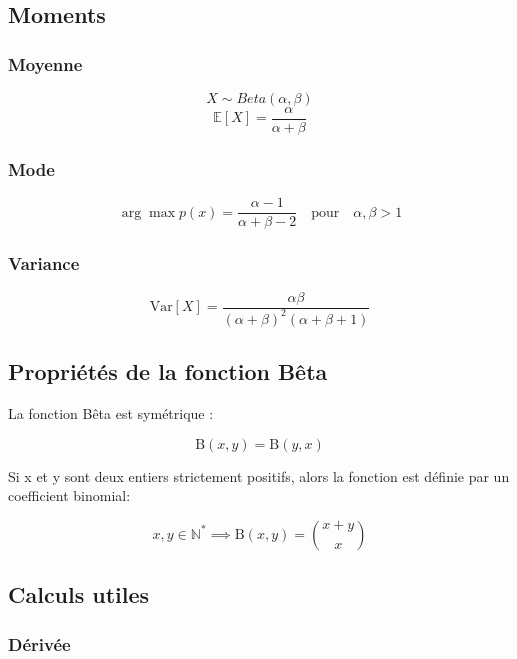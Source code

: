 \documentclass[french]{article}
\numberwithin{equation}{section}
\begin{document}
\subsection{Moments}

\subsubsection{Moyenne}

\[ X \sim Beta(\alpha, \beta) \]
\begin{equation}
\mathbb{E}[X] = \frac{\alpha}{\alpha + \beta}
\end{equation}

\subsubsection{Mode}

\begin{equation}
\arg\max p(x) = \frac{\alpha - 1}{\alpha + \beta - 2} \quad \text{pour} \quad \alpha, \beta > 1
\end{equation}

\subsubsection{Variance}

\begin{equation}
\text{Var}[X] = \frac{\alpha \beta}{(\alpha + \beta)^2(\alpha + \beta + 1)}
\end{equation}

\subsection{Propriétés de la fonction Bêta}

La fonction Bêta est symétrique :

\[
\text{B}(x, y) = \text{B}(y, x)
\]

Si x et y sont deux entiers strictement positifs, alors la fonction est définie par un coefficient binomial:

\begin{equation}
x, y \in \mathbb{N^*} \implies \text{B}(x, y) = \binom{x+y}{x}
\end{equation}

\subsection{Calculs utiles}

\subsubsection{Dérivée}
\end{document}
